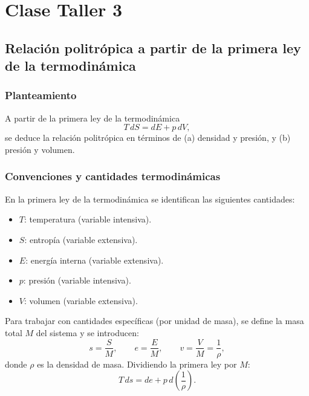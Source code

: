 \shorthandoff{<>}



\shorthandon{<>}

\chapter{Clase Taller 3}

\section{Relación politrópica a partir de la primera ley de la termodinámica}

\subsection{Planteamiento}

A partir de la primera ley de la termodinámica
$$
T\,dS = dE + p\,dV,
$$
se deduce la relación politrópica en términos de (a) densidad y presión, y (b) presión y volumen.

\subsection{Convenciones y cantidades termodinámicas}

En la primera ley de la termodinámica se identifican las siguientes cantidades:

\begin{itemize}
    \item $T$: temperatura (variable intensiva).
    \item $S$: entropía (variable extensiva).
    \item $E$: energía interna (variable extensiva).
    \item $p$: presión (variable intensiva).
    \item $V$: volumen (variable extensiva).
\end{itemize}

Para trabajar con cantidades específicas (por unidad de masa), se define la masa total $M$ del sistema y se introducen:
$$
s = \frac{S}{M}, \qquad e = \frac{E}{M}, \qquad v = \frac{V}{M} = \frac{1}{\rho},
$$
donde $\rho$ es la densidad de masa. Dividiendo la primera ley por $M$:
$$
T\,ds = de + p\,d\!\left(\frac{1}{\rho}\right).
$$

